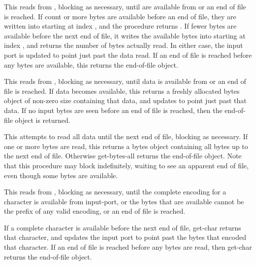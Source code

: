 \begin{entry}{%
}
   
   
This reads from , blocking as necessary, until
 are available from  or an end of file is
reached. If count or more bytes are available before an end of file,
they are written into  starting at index , and
the procedure returns . If fewer bytes are available before
the next end of file, it writes the available bytes into 
starting at index , and returns the number of bytes actually
read. In either case, the input port is updated to point just past the
data read. If an end of file is reached before any bytes
are available, this returns the end-of-file object.
\end{entry}

\begin{entry}{%
}
   
This reads from , blocking as necessary, until data is
available from  or an end of file is reached.  If data
becomes available, this returns a freshly allocated bytes object of
non-zero size containing that data, and updates  to
point just past that data.  If no input bytes are seen before an end
of file is reached, then the end-of-file object is returned.
\end{entry}

\begin{entry}{%
}
   
This attempts to read all data until the next end of file, blocking as
necessary. If one or more bytes are read, this returns a bytes object
containing all bytes up to the next end of file.  Otherwise {\cf
  get-bytes-all} returns the end-of-file object. Note that this
procedure may block indefinitely, waiting to see an apparent end of
file, even though some bytes are available.
\end{entry}

\begin{entry}{%
}
   
This reads from , blocking as necessary, until the
complete encoding for a character is available from input-port, or the
bytes that are available cannot be the prefix of any valid encoding,
or an end of file is reached.

If a complete character is available before the next end of file, {\cf
  get-char} returns that character, and updates the input port to
point past the bytes that encoded that character. If an end of file is
reached before any bytes are read, then {\cf get-char} returns the
end-of-file object.
\end{entry}

